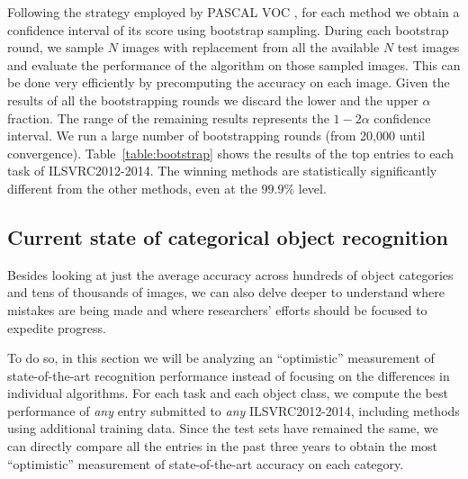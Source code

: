 Following the strategy employed by  PASCAL VOC \citep{PASCALIJCV2}, for each method we obtain a 
confidence interval of its score using bootstrap sampling. During each bootstrap round, we sample $N$ images with replacement
from all the available $N$ test images and evaluate the performance of the algorithm 
on those sampled images. This can be done very efficiently by precomputing the accuracy on each image. 
Given the results of all the bootstrapping rounds we discard the lower and the upper
 $\alpha$ fraction. The range of the remaining results represents the $1-2\alpha$ confidence interval.
We run a large number of bootstrapping rounds
(from 20,000 until convergence).   Table~\ref{table:bootstrap} shows
the results of the top entries to each task of ILSVRC2012-2014. The winning methods are statistically significantly different
from the other methods, even at the $99.9\%$ level.






\subsection{Current state of categorical object recognition}
\label{sec:ResultsICCV}

Besides looking at just the average accuracy across hundreds of object categories and tens of thousands of images, we can also delve deeper to understand where mistakes are being made and where researchers' efforts should be focused to expedite progress. 

To do so, in this section we will be analyzing an ``optimistic'' measurement of state-of-the-art recognition performance instead of focusing on the differences in individual algorithms. For each task and each object class, we compute the best performance of \emph{any} entry submitted to \emph{any} ILSVRC2012-2014, including methods using additional training data. Since the test sets have remained the same, we can directly compare all the entries in the past three years to obtain the most ``optimistic'' measurement of state-of-the-art accuracy on each category. 

